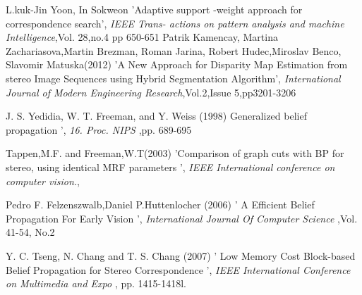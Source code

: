 \documentclass{singlecol-new}
\theoremstyle{TH}{
\newtheorem{lemma}{Lemma}
\newtheorem{theorem}[lemma]{Theorem}
\newtheorem{corrolary}[lemma]{Corrolary}
\newtheorem{conjecture}[lemma]{Conjecture}
\newtheorem{proposition}[lemma]{Proposition}
\newtheorem{claim}[lemma]{Claim}
\newtheorem{stheorem}[lemma]{Wrong Theorem}
\newtheorem{algorithm}{Algorithm}
}
\theoremstyle{THrm}{
\newtheorem{definition}{Definition}[section]
\newtheorem{question}{Question}[section]
\newtheorem{remark}{Remark}
\newtheorem{scheme}{Scheme}
}
\theoremstyle{THhit}{
\newtheorem{case}{Case}[section]
}
\begin{document}








%
%
%
\begin{thebibliography}{10}
L.kuk-Jin Yoon, In Sokweon   'Adaptive support -weight approach for correspondence search', {\it IEEE Trans- actions on pattern analysis and machine Intelligence},Vol. 28,no.4 pp 650-651
Patrik Kamencay, Martina Zachariasova,Martin Brezman, Roman Jarina, Robert Hudec,Miroslav Benco, Slavomir Matuska(2012) 'A New Approach for Disparity Map Estimation from stereo Image Sequences using Hybrid Segmentation Algorithm', {\it International Journal of Modern Engineering Research},Vol.2,Issue 5,pp3201-3206


J.  S.  Yedidia,  W.  T.  Freeman,  and  Y.  Weiss                                                                                                                 (1998)                 Generalized  belief  propagation                                                                                        ', {\it 16.	Proc. NIPS                                            },pp. 689-695


Tappen,M.F. and Freeman,W.T(2003) 'Comparison of graph cuts with BP for stereo, using identical MRF parameters ', {\it IEEE International conference on computer vision.},



 Pedro  F.  Felzenszwalb,Daniel  P.Huttenlocher (2006) ' A  Efficient  Belief  Propagation  For Early Vision ', {\it    International Journal Of Computer Science}                                                           ,Vol. 41-54, No.2


 	Y. C. Tseng, N. Chang and T. S. Chang                                               (2007) ' Low Memory Cost Block-based Belief Propagation for Stereo Correspondence                           ', {\it  IEEE International Conference on Multimedia and Expo                                                                                                        },  pp. 1415-1418l.


\end{thebibliography}
\end{document}
